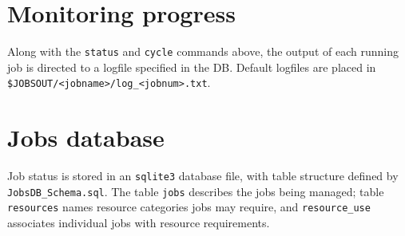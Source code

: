 \documentclass[12pt,english]{article}
\newcommand{\cd}[1]{\texorpdfstring{{\color{blue} \texttt{#1}}}{#1}}
\begin{document}
\section{Monitoring progress}

Along with the \cd{status} and \cd{cycle} commands above,
    the output of each running job is directed to a logfile specified in the DB.
Default logfiles are placed in \cd{\$JOBSOUT/<jobname>/log\_<jobnum>.txt}.

















\section{Jobs database}

Job status is stored in an \cd{sqlite3} database file, with table structure defined by \cd{JobsDB\_Schema.sql}.
The table \cd{jobs} describes the jobs being managed; table \cd{resources} names resource categories jobs may require,
    and \cd{resource\_use} associates individual jobs with resource requirements.



\end{document}
